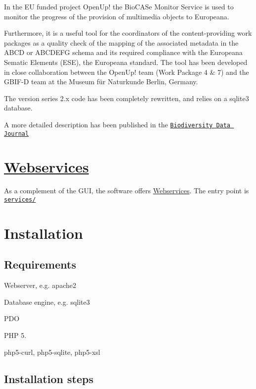 In the EU funded project Open\+Up! the Bio\+C\+A\+Se Monitor Service is used to monitor the progress of the provision of multimedia objects to Europeana.

Furthermore, it is a useful tool for the coordinators of the content-\/providing work packages as a quality check of the mapping of the associated metadata in the A\+B\+CD or A\+B\+C\+D\+E\+FG schema and its required compliance with the Europeana Sematic Elements (E\+SE), the Europeana standard. The tool has been developed in close collaboration between the Open\+Up! team (Work Package 4 \& 7) and the G\+B\+I\+F-\/D team at the Museum für Naturkunde Berlin, Germany.

The version series 2.\+x code has been completely rewritten, and relies on a sqlite3 database.

A more detailed description has been published in the \href{https://www.ncbi.nlm.nih.gov/pmc/articles/PMC3964725/}{\tt Biodiversity Data Journal}

\section*{\hyperlink{namespace_webservices}{Webservices}}

As a complement of the G\+UI, the software offers \hyperlink{namespace_webservices}{Webservices}. The entry point is \href{/services/}{\tt services/}





\section*{Installation}

\subsection*{Requirements}


\begin{DoxyItemize}
\item Webserver, e.\+g. apache2
\item Database engine, e.\+g. sqlite3
\item P\+DO
\item P\+HP 5.
\item php5-\/curl, php5-\/sqlite, php5-\/xsl
\end{DoxyItemize}

\subsection*{Installation steps}


